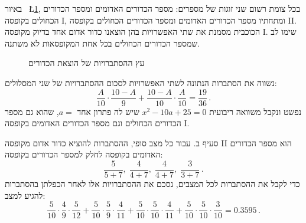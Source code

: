 \documentclass[12pt,a4paper]{article}
\begin{document}
באיור~%
\L{\ref{fig.summer-2017b.1}},
בכל צומת רשום שני זוגות של מספרים: מספר הכדורים האדומים ומספר הכדורים הכחולים בקופסה
\textsf{I},
ומתחתיו מספר הכדורים האדומים ומספר הכדורים הכחולים בקופסה
\textsf{II}.
הכוכבית מסמנת את שתי האפשרויות בהן הוצאנו כדור אדום אחד בדיוק מקופסה
\textsf{I}.
שימו לב שמספר הכדורים הכחולים בכל אחת המקופסאות לא משתנה.
\begin{figure}
\begin{center}
\caption{עץ ההסתברויות של הוצאת הכדורים}\label{fig.summer-2017b.1}
\end{center}
\end{figure}
נשווה את הסתברות הנתונה לשתי האפשרויות לסכום ההסתברויות של שני המסלולים:
\[
\frac{A}{10}\cdot\frac{10-A}{9} + \frac{10-A}{10}\cdot\frac{A}{10} = \frac{19}{36}\,.
\]
נפשט ונקבל משוואה ריבועית 
$x^2-10a+25=0$
שיש לה פתרון אחד
$a=$,
שהוא גם מספר הכדורים הכחולים  וגם מספר הכדורים האדומים בקופסה
\textsf{I}.

סעיף ב. עבור כל מצב סופי, ההסתברות להוציא כדור אדום מקופסה
\textsf{II}
הוא מספר הכדורים האדומים בקופסה לחלק למספר הכדורים בקופסה:
\[
\frac{5}{5+7},\; \frac{4}{4+7},\; \frac{4}{4+7},\; \frac{3}{3+7}\,.
\]
כדי לקבל את ההסתברות לכל המצבים, נסכם את ההסתברויות אלו לאחר הכפלתן בהסתברות להגיע למצב:
\[
\frac{5}{10}\cdot\frac{4}{9}\cdot\frac{5}{12}+\frac{5}{10}\cdot\frac{5}{9}\cdot\frac{4}{11}+\frac{5}{10}\cdot\frac{5}{10}\cdot\frac{4}{11}+\frac{5}{10}\cdot\frac{5}{10}\cdot\frac{3}{10}=0.3595\,.
\]
\end{document}
